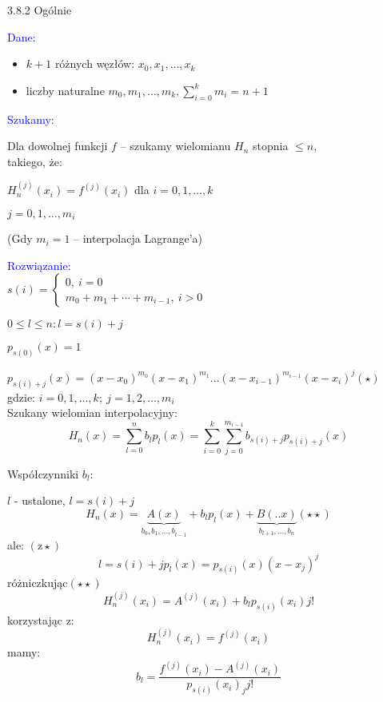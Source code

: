 \begin{frame}
{3.8.2 Ogólnie}

\textcolor{blue}{Dane:}
\begin{itemize}
\item $k+1$ różnych węzłów: $x_{0}, x_{1}, \dots, x_{k}$

\item liczby naturalne $m_{0}, m_{1},\dots , m_{k}, \displaystyle \sum_{i=0}^{k}m_{i}=n+1$
\end{itemize}
\textcolor{blue}{Szukamy:}

Dla dowolnej funkcji $f$ -- szukamy wielomianu $H_{n}$ stopnia $\leq n,$ \\
takiego, że:

$H_{n}^{(j)}(x_{i})=f^{(j)}(x_{i})$ \quad dla $i=0, 1, \dots , k$
\begin{center}
$j=0, 1, \dots, m_{i}$
\end{center}
(Gdy $m_{i}=1$ -- interpolacja Lagrange'a)
\end{frame}

\begin{frame}
\textcolor{blue}{Rozwiązanie:} \\
\vspace{2mm}
$s(i)=\left\{\begin{array}{l}
0,\ i=0\\
m_{0}+m_{1}+\cdots+m_{i-1},\ i>0
\end{array}\right.$
\vspace{2mm}

$0\leq l\leq n:l=s(i)+j$

$p_{s(0)}(x)=1$

$p_{s(i)+j}(x)=(x-x_{0})^{m_{0}}(x-x_{1})^{m_{1}}\ldots(x-x_{i-1})^{m_{i-1}}(x-x_{i})^{j}(\star)$ \\
gdzie: $i=0, 1, \dots, k; \: j=1, 2, \dots , m_{i}$ \\
\vspace{3mm}
Szukany wielomian interpolacyjny:
$$
H_{n}(x)=\sum_{l=0}^{n}b_{l}p_{l}(x)=\sum_{i=0}^{k}\sum_{j=0}^{m_{i-1}}b_{s(i)+j}p_{s(i)+j}(x)
$$
\end{frame}

\begin{frame}
Współczynniki $b_{l}$:


$l$ - ustalone, $l=s(i)+j$
$$
H_{n}(x)=\underbrace{A(x)}_{b_{0},{b_{1},\ldots,b}_{l-1}}+b_{l}p_{l}(x)+\underbrace{B(..x)}_{b_{l+1},\ldots,b_{n}}(\star\star)
$$
ale: $(\mathrm{z}\star)$
$$
l=s(i)+jp_{l}(x)=p_{s(i)}(x)(x-x_{j})^{j}
$$
$
$różniczkując$(\star\star)
$
$$
H_{n}^{(j)}(x_{i})=A^{(j)}(x_{i})+b_{l}p_{s(i)}(x_{i})j!
$$
korzystając $\mathrm{z}$:
$$
H_{n}^{(j)}(x_{i})=f^{(j)}(x_{i})
$$
mamy:
$$
b_{l}=\frac{f^{(j)}(x_{i})-A^{(j)}(x_{i})}{p_{s(i)}(x_{i})_{j}j!}
$$

\end{frame}
